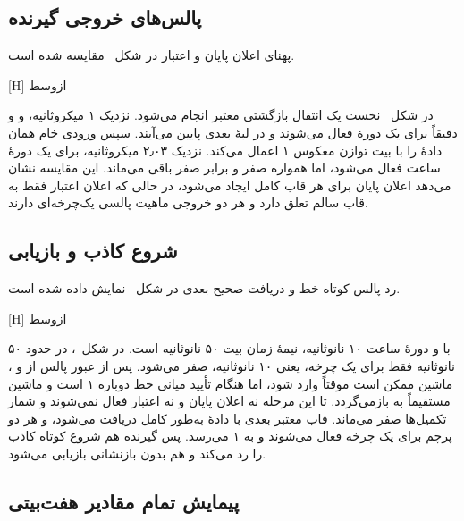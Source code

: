 \subsection{پالس‌های خروجی گیرنده}

پهنای اعلان پایان و اعتبار در شکل~ مقایسه شده است.

[H]
‌ازوسط

در شکل~ نخست یک انتقال بازگشتی معتبر  انجام می‌شود.
نزدیک ۱ میکروثانیه،  و  و
 دقیقاً برای یک دورهٔ  فعال می‌شوند و در لبهٔ بعدی پایین
می‌آیند. سپس ورودی خام همان دادهٔ  را با بیت توازن معکوس ۱ اعمال می‌کند. نزدیک
۲٫۰۳ میکروثانیه،  برای یک دورهٔ ساعت فعال می‌شود، اما
 همواره صفر و  برابر صفر باقی می‌ماند.
این مقایسه نشان می‌دهد اعلان پایان برای هر قاب کامل ایجاد می‌شود، در حالی که اعلان اعتبار
فقط به قاب سالم تعلق دارد و هر دو خروجی ماهیت پالسی یک‌چرخه‌ای دارند.


\subsection{شروع کاذب و بازیابی}

رد پالس کوتاه خط و دریافت صحیح بعدی در شکل~ نمایش داده شده است.

[H]
‌ازوسط

با  و دورهٔ ساعت ۱۰ نانوثانیه، نیمهٔ زمان بیت ۵۰ نانوثانیه است. در
شکل~،  در حدود ۵۰ نانوثانیه فقط برای یک چرخه، یعنی ۱۰
نانوثانیه، صفر می‌شود. پس از عبور پالس از  و ، ماشین ممکن
است موقتاً وارد  شود، اما هنگام تأیید میانی خط دوباره ۱ است و ماشین مستقیماً به
 بازمی‌گردد. تا این مرحله نه اعلان پایان و نه اعتبار فعال نمی‌شوند و شمار تکمیل‌ها
صفر می‌ماند. قاب معتبر بعدی با دادهٔ  به‌طور کامل دریافت می‌شود،
 و هر دو پرچم برای یک چرخه فعال می‌شوند و
 به ۱ می‌رسد. پس گیرنده هم شروع کوتاه کاذب را رد می‌کند و هم بدون
بازنشانی بازیابی می‌شود.


\subsection{پیمایش تمام مقادیر هفت‌بیتی}

